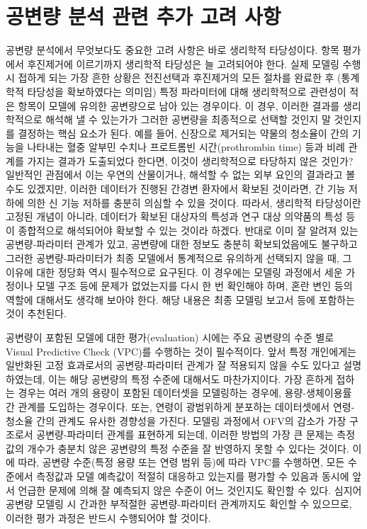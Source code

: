 \documentclass[
  10pt,
]{krantz}
\begin{document}
\hypertarget{uxacf5uxbcc0uxb7c9-uxbd84uxc11d-uxad00uxb828-uxcd94uxac00-uxace0uxb824-uxc0acuxd56d}{%
\section{공변량 분석 관련 추가 고려 사항}\label{uxacf5uxbcc0uxb7c9-uxbd84uxc11d-uxad00uxb828-uxcd94uxac00-uxace0uxb824-uxc0acuxd56d}}

공변량 분석에서 무엇보다도 중요한 고려 사항은 바로 생리학적 타당성이다. 항목 평가에서 후진제거에 이르기까지 생리학적 타당성은 늘
고려되어야 한다. 실제 모델링 수행 시 접하게 되는 가장 흔한 상황은 전진선택과 후진제거의 모든 절차를 완료한 후 (통계학적
타당성을 확보하였다는 의미임) 특정 파라미터에 대해 생리학적으로 관련성이 적은 항목이 모델에 유의한 공변량으로 남아
있는 경우이다. 이 경우, 이러한 결과를 생리학적으로 해석해 낼 수 있는가가 그러한 공변량을 최종적으로 선택할 것인지 말
것인지를 결정하는 핵심 요소가 된다. 예를 들어, 신장으로 제거되는 약물의 청소율이 간의 기능을 나타내는 혈중 알부민 수치나
프로트롬빈 시간(prothrombin time) 등과 비례 관계를 가지는 결과가 도출되었다 한다면, 이것이 생리학적으로
타당하지 않은 것인가? 일반적인 관점에서 이는 우연의 산물이거나, 해석할 수 없는 외부 요인의 결과라고 볼 수도
있겠지만, 이러한 데이터가 진행된 간경변 환자에서 확보된 것이라면, 간 기능 저하에 의한 신 기능 저하를 충분히 의심할 수
있을 것이다. 따라서, 생리학적 타당성이란 고정된 개념이 아니라, 데이터가 확보된 대상자의 특성과 연구 대상 의약품의 특성 등이
종합적으로 해석되어야 확보할 수 있는 것이라 하겠다. 반대로 이미 잘 알려져 있는 공변량-파라미터 관계가 있고, 공변량에 대한
정보도 충분히 확보되었음에도 불구하고 그러한 공변량-파라미터가 최종 모델에서 통계적으로 유의하게 선택되지 않을 때, 그 이유에
대한 정당화 역시 필수적으로 요구된다. 이 경우에는 모델링 과정에서 세운 가정이나 모델 구조 등에 문제가 없었는지를 다시
한 번 확인해야 하며, 혼란 변인 등의 역할에 대해서도 생각해 보아야 한다. 해당 내용은 최종 모델링 보고서 등에 포함하는
것이 추천된다.

공변량이 포함된 모델에 대한 평가(evaluation) 시에는 주요 공변량의 수준 별로 Visual Predictive Check
(VPC)를 수행하는 것이 필수적이다. 앞서 특정 개인에게는 일반화된 고정 효과로서의 공변량-파라미터 관계가 잘 적용되지 않을
수도 있다고 설명하였는데, 이는 해당 공변량의 특정 수준에 대해서도 마찬가지이다. 가장 흔하게 접하는 경우는 여러 개의
용량이 포함된 데이터셋을 모델링하는 경우에, 용량-생체이용률 간 관계를 도입하는 경우이다. 또는, 연령이 광범위하게
분포하는 데이터셋에서 연령-청소율 간의 관계도 유사한 경향성을 가진다. 모델링 과정에서 OFV의 감소가 가장
구조로서 공변량-파라미터 관계를 표현하게 되는데, 이러한 방법의 가장 큰 문제는 측정값의 개수가 충분치 않은
공변량의 특정 수준을 잘 반영하지 못할 수 있다는 것이다. 이에 따라, 공변량 수준(특정 용량 또는 연령 범위
등)에 따라 VPC를 수행하면, 모든 수준에서 측정값과 모델 예측값이 적절히 대응하고 있는지를 평가할 수 있음과 동시에
앞서 언급한 문제에 의해 잘 예측되지 않은 수준이 어느 것인지도 확인할 수 있다. 심지어 공변량 모델링 시 간과한 부적절한
공변량-파라미터 관계까지도 확인할 수 있으므로, 이러한 평가 과정은 반드시 수행되어야 할 것이다.
\end{document}
